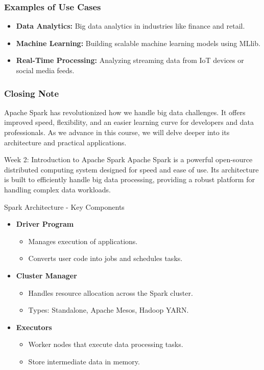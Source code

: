 \documentclass[aspectratio=169]{beamer}
\begin{document}
\begin{frame}[fragile]
    \frametitle{Examples of Use Cases}
    \begin{itemize}
        \item \textbf{Data Analytics:} Big data analytics in industries like finance and retail.
        \item \textbf{Machine Learning:} Building scalable machine learning models using MLlib.
        \item \textbf{Real-Time Processing:} Analyzing streaming data from IoT devices or social media feeds.
    \end{itemize}
\end{frame}

\begin{frame}[fragile]
    \frametitle{Closing Note}
    Apache Spark has revolutionized how we handle big data challenges. It offers improved speed, flexibility, and an easier learning curve for developers and data professionals. As we advance in this course, we will delve deeper into its architecture and practical applications.
\end{frame}

\begin{frame}[fragile]{Week 2: Introduction to Apache Spark}
    Apache Spark is a powerful open-source distributed computing system designed for speed and ease of use. Its architecture is built to efficiently handle big data processing, providing a robust platform for handling complex data workloads.
\end{frame}

\begin{frame}[fragile]{Spark Architecture - Key Components}
    \begin{itemize}
        \item \textbf{Driver Program}
        \begin{itemize}
            \item Manages execution of applications.
            \item Converts user code into jobs and schedules tasks.
        \end{itemize}

        \item \textbf{Cluster Manager}
        \begin{itemize}
            \item Handles resource allocation across the Spark cluster.
            \item Types: Standalone, Apache Mesos, Hadoop YARN.
        \end{itemize}

        \item \textbf{Executors}
        \begin{itemize}
            \item Worker nodes that execute data processing tasks.
            \item Store intermediate data in memory.
        \end{itemize}
    \end{itemize}
\end{frame}
\end{document}
